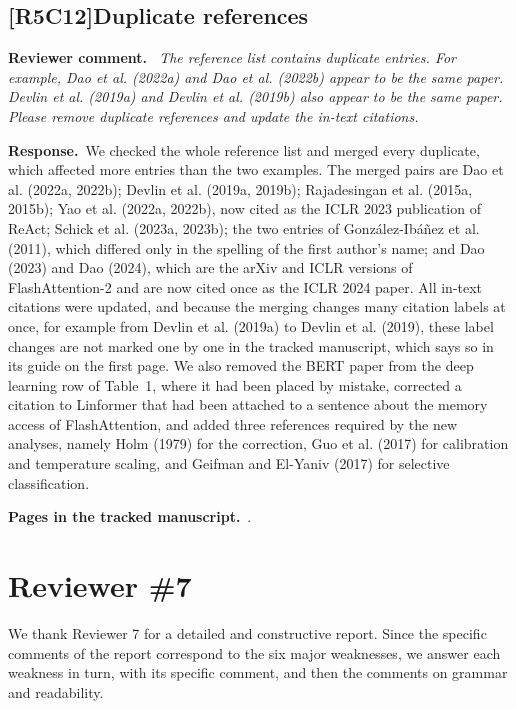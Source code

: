 \documentclass[11pt,a4paper]{article}
\newcommand{\comment}[3]{\subsection*{\textcolor{#1}{[#2]}\enspace #3}}
\newenvironment{reviewercomment}{\par\noindent\textbf{Reviewer comment.}\itshape\ }{\par}
\newcommand{\response}{\par\noindent\textbf{Response.}\ }
\newcommand{\where}[1]{\par\noindent\textbf{Pages in the tracked manuscript.}\ \rvpages[M-]{#1}.}
\begin{document}
\comment{rvFive}{R5C12}{Duplicate references}
\begin{reviewercomment}
The reference list contains duplicate entries. For example, Dao et al. (2022a) and Dao et al. (2022b) appear to be the same paper. Devlin et al. (2019a) and Devlin et al. (2019b) also appear to be the same paper. Please remove duplicate references and update the in-text citations.
\end{reviewercomment}
\response We checked the whole reference list and merged every duplicate, which affected more entries than the two examples. The merged pairs are Dao et al. (2022a, 2022b); Devlin et al. (2019a, 2019b); Rajadesingan et al. (2015a, 2015b); Yao et al. (2022a, 2022b), now cited as the ICLR 2023 publication of ReAct; Schick et al. (2023a, 2023b); the two entries of Gonz\'alez-Ib\'a\~nez et al. (2011), which differed only in the spelling of the first author's name; and Dao (2023) and Dao (2024), which are the arXiv and ICLR versions of FlashAttention-2 and are now cited once as the ICLR 2024 paper. All in-text citations were updated, and because the merging changes many citation labels at once, for example from Devlin et al. (2019a) to Devlin et al. (2019), these label changes are not marked one by one in the tracked manuscript, which says so in its guide on the first page. We also removed the BERT paper from the deep learning row of Table~1, where it had been placed by mistake, corrected a citation to Linformer that had been attached to a sentence about the memory access of FlashAttention, and added three references required by the new analyses, namely Holm (1979) for the correction, Guo et al. (2017) for calibration and temperature scaling, and Geifman and El-Yaniv (2017) for selective classification.

\where{R5C12}

\section*{Reviewer \#7}

We thank Reviewer 7 for a detailed and constructive report. Since the specific comments of the report correspond to the six major weaknesses, we answer each weakness in turn, with its specific comment, and then the comments on grammar and readability.
\end{document}
